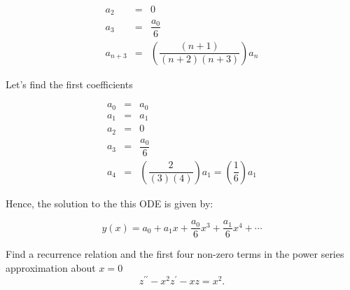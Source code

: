 \documentclass[11pt]{article}
\begin{document}
\begin{solution}
\begin{eqnarray*}
a_{2} & = & 0 \\
a_{3} & = & \dfrac{a_{0}}{6} \\
a_{n+3} & = & \left(\dfrac{(n+1)}{(n+2)(n+3)}\right)a_{n}
\end{eqnarray*}

Let's find the first coefficients

\begin{eqnarray*}
a_{0} & = & a_{0} \\
a_{1} & = & a_{1}\\
a_{2} & = & 0 \\
a_{3} & = & \dfrac{a_{0}}{6}  \\
a_{4} & = & \left(\dfrac{2}{(3)(4)}\right)a_{1}  =  \left(\dfrac{1}{6}\right)a_{1}  
\end{eqnarray*}

Hence, the solution to the this ODE is given by:

\begin{equation*}
\boxed{y(x) = a_{0} + a_{1}x + \frac{a_{0}}{6}x^{3} + \frac{a_{1}}{6}x^{4}+\cdots}
\end{equation*}
\end{solution}



\begin{problem}
{Find a recurrence relation and the first four non-zero terms in the power series approximation about $x=0$}
\begin{equation*}
z^{\prime \prime} - x^2 z^{\prime} - xz =x^2.
\end{equation*}
\end{problem}
\end{document}
